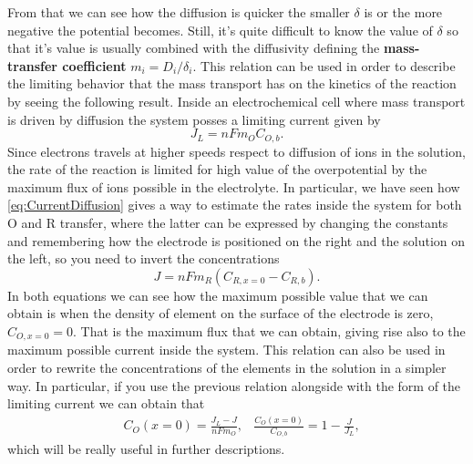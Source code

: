 From that we can see how the diffusion is quicker the smaller $\delta$ is or the more negative the potential becomes. Still, it's quite difficult to know the value of $\delta$ so that it's value is usually combined with the diffusivity defining the \textbf{mass-transfer coefficient} $m_i = D_i/\delta_i$. This relation can be used in order to describe the limiting behavior that the mass transport has on the kinetics of the reaction by seeing the following result.
{
    Inside an electrochemical cell where mass transport is driven by diffusion the system posses a limiting current given by
    \begin{equation}
        J_L = nFm_O C_{O,b}.
    \end{equation}
}
{
    Since electrons travels at higher speeds respect to diffusion of ions in the solution, the rate of the reaction is limited for high value of the overpotential by the maximum flux of ions possible in the electrolyte. In particular, we have seen how \eqref{eq:CurrentDiffusion} gives a way to estimate the rates inside the system for both O and R transfer, where the latter can be expressed by changing the constants and remembering how the electrode is positioned on the right and the solution on the left, so you need to invert the concentrations
    \begin{equation}
        J = nFm_R (C_{R, x=0} - C_{R,b}).
    \end{equation} 
    In both equations we can see how the maximum possible value that we can obtain is when the density of element on the surface of the electrode is zero, $C_{O, x=0} = 0$. That is the maximum flux that we can obtain, giving rise also to the maximum possible current inside the system.
}
\noindent
This relation can also be used in order to rewrite the concentrations of the elements in the solution in a simpler way. In particular, if you use the previous relation alongside with the form of the limiting current we can obtain that
\begin{align}
    &C_{O}(x=0) = \frac{J_L - J}{nFm_O}, &\frac{C_{O}(x=0)}{C_{O, b}} = 1 - \frac{J}{J_L},
\end{align}
which will be really useful in further descriptions.